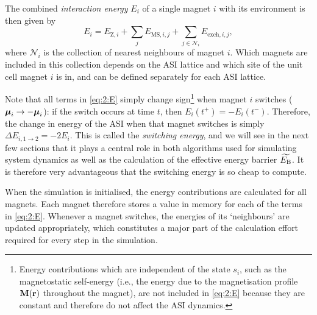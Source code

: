 The combined \textit{interaction energy} $E_i$ of a single magnet $i$ with its environment is then given by
\begin{equation}
	\label{eq:2:E}
	E_i = E_{\mathrm{Z},i} + \sum_j E_{\mathrm{MS},i,j} + \sum_{j \in \mathcal{N}_i} E_{\mathrm{exch},i,j} \mathrm{,}
\end{equation}
where $\mathcal{N}_i$ is the collection of nearest neighbours of magnet $i$.
Which magnets are included in this collection depends on the ASI lattice and which site of the unit cell magnet $i$ is in, and can be defined separately for each ASI lattice. \\\par
Note that all terms in \cref{eq:2:E} simply change sign\footnote{
	Energy contributions which are independent of the state $s_i$, such as the magnetostatic self-energy (i.e., the energy due to the magnetisation profile $\boldsymbol{\mathbf{M}}(\boldsymbol{\mathbf{r}})$ throughout the magnet), are not included in \cref{eq:2:E} because they are constant and therefore do not affect the ASI dynamics.
} when magnet $i$ switches ($\boldsymbol{\mathbf{\mu}}_i \rightarrow -\boldsymbol{\mathbf{\mu}}_i$): if the switch occurs at time $t$, then $E_i(t^+) = -E_i(t^-)$.
Therefore, the change in energy of the ASI when that magnet switches is simply $\Delta E_{i,1\rightarrow2} = -2 E_i$.
This is called the \textit{switching energy}, and we will see in the next few sections that it plays a central role in both algorithms used for simulating system dynamics as well as the calculation of the effective energy barrier $\widetilde{E_\mathrm{B}}$.
It is therefore very advantageous that the switching energy is so cheap to compute. \par
When the simulation is initialised, the energy contributions are calculated for all magnets.
Each magnet therefore stores a value in memory for each of the terms in \cref{eq:2:E}.
Whenever a magnet switches, the energies of its `neighbours' are updated appropriately, which constitutes a major part of the calculation effort required for every step in the simulation.

